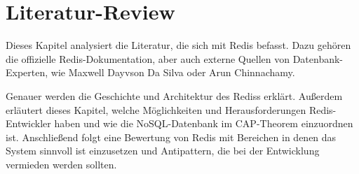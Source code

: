 
\chapter{Literatur-Review}

Dieses Kapitel analysiert die Literatur, die sich mit \ac{Redis} befasst. Dazu gehören die offizielle \ac{Redis}-Dokumentation, aber auch externe Quellen von Datenbank-Experten, wie Maxwell Dayvson Da Silva oder Arun Chinnachamy. 

Genauer werden die Geschichte und Architektur des \acl{Redis}s erklärt. Außerdem erläutert dieses Kapitel, welche Möglichkeiten und Herausforderungen \ac{Redis}-Entwickler haben und wie die \ac{NoSQL}-Datenbank im \acs{CAP}-Theorem einzuordnen ist. Anschließend folgt eine Bewertung von \ac{Redis} mit Bereichen in denen das System sinnvoll ist einzusetzen und Antipattern, die bei der Entwicklung vermieden werden sollten.